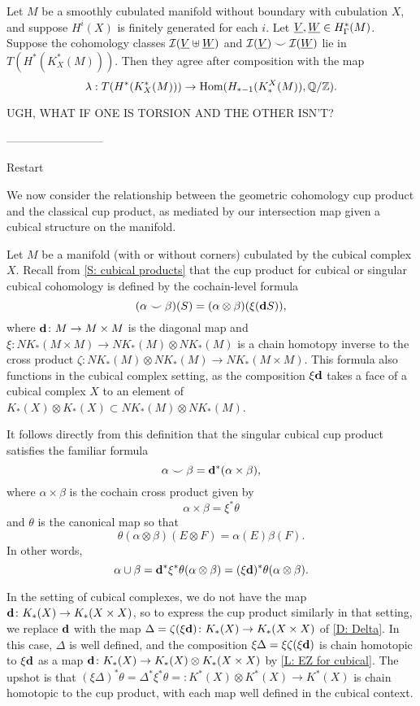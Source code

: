 \documentclass{amsart}
\begin{document}
\begin{proposition}
Let $M$ be a smoothly cubulated manifold without boundary with cubulation $X$, and suppose $H^i(X)$ is finitely generated for each $i$. Let $\underline{V},\underline{W}\in H^*_\Gamma(M)$. Suppose the cohomology classes $\mathcal{I}(\underline{V}\uplus\underline{W})$ and $\mathcal{I}(\underline{V}) \smile \mathcal{I}(\underline{W})$ lie in $T(H^*(K_X^*(M)))$. Then they agree after composition with the map $$\lambda:T(H^*(K_X^*(M)))\to \textup{Hom}(H_{*-1}(K_*^X(M)),\mathbb{Q}/\mathbb{Z}).$$
\end{proposition}

UGH, WHAT IF ONE IS TORSION AND THE OTHER ISN'T?

--------------------------

Restart


We now consider the relationship between the geometric cohomology cup product and the classical cup product, as mediated by our intersection map given a cubical structure on the manifold.

Let $M$ be a manifold (with or without corners) cubulated by the cubical complex $X$.
Recall from \cref{S: cubical products} that the cup product for cubical or singular cubical cohomology is defined by the cochain-level formula
\begin{equation}\label{E: cubical cup}
	(\alpha \smile \beta)(S) = (\alpha \otimes \beta)(\xi(\mathbf{d} S)),
\end{equation}
where $\mathbf{d} \colon M \to M \times M$ is the diagonal map and $\xi \colon NK_*(M \times M) \to NK_*(M) \otimes NK_*(M)$ is a chain homotopy inverse to the cross product $\zeta \colon NK_*(M) \otimes NK_*(M) \to NK_*(M \times M)$.
This formula also functions in the cubical complex setting, as the composition $\xi \mathbf{d}$ takes a face of a cubical complex $X$ to an element of $K_*(X) \otimes K_*(X) \subset NK_*(M) \otimes NK_*(M)$.

It follows directly from this definition that the singular cubical cup product satisfies the familiar formula $$\alpha \smile \beta = \mathbf{d}^*(\alpha \times \beta),$$
where $\alpha \times \beta$ is the cochain cross product given by $$\alpha \times \beta = \xi^*\theta$$
and $\theta$ is the canonical map so that $$\theta(\alpha \otimes \beta)(E \otimes F) = \alpha(E)\beta(F).$$
In other words, $$\alpha \cup \beta = \mathbf{d}^* \xi^* \theta(\alpha \otimes \beta) = (\xi \mathbf{d})^*\theta (\alpha \otimes \beta).$$

In the setting of cubical complexes, we do not have the map $\mathbf{d} \colon K_*(X) \to K_*(X \times X) $, so to express the cup product similarly in that setting, we replace $\mathbf{d}$ with the map   $\Delta = \zeta (\xi \mathbf{d}) \colon K_*(X) \to K_*(X \times X)$ of \cref{D: Delta}.
In this case, $\Delta $ is well defined, and the composition $\xi \Delta = \xi \zeta (\xi \mathbf{d})$ is chain homotopic to $\xi \mathbf{d}$ as a map $\mathbf{d} \colon K_*(X) \to K_*(X) \otimes K_*( X\times X)$ by \cref{L: EZ for cubical}.
The upshot is that $(\xi \Delta)^*\theta = \Delta^* \xi^* \theta = \colon K^*(X) \otimes K^*(X) \to K^*(X)$ is chain homotopic to the cup product, with each map well defined in the cubical context.
\end{document}
